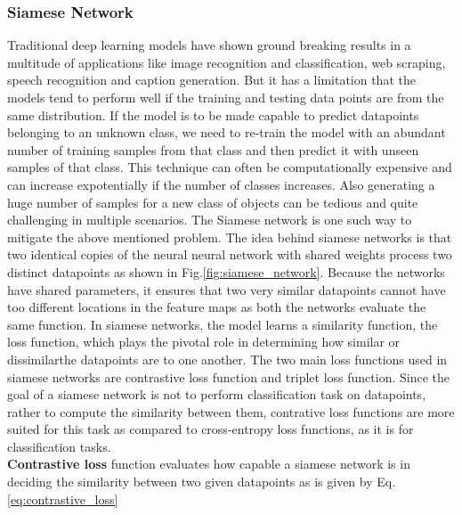 \subsubsection{Siamese Network}
Traditional deep learning models have shown ground breaking results in a multitude of applications like image recognition and classification, web scraping, speech recognition and caption generation. But it has a limitation that the models tend to perform well if the training and testing data points are from the same distribution. If the model is to be made capable to predict datapoints belonging to an unknown class, we need to re-train the model with an abundant number of training samples from that class and then predict it with unseen samples of that class. This technique can often be computationally expensive and can increase expotentially if the number of classes increases. Also generating a huge number of samples for a new class of objects can be tedious and quite challenging in multiple scenarios. The Siamese network\cite*{koch2015siamese,bromley1993signature} is one such way to mitigate the above mentioned problem. The idea behind siamese networks is that two identical copies of the neural neural network with shared weights process two distinct datapoints as shown in Fig.\ref*{fig:siamese_network}. Because the networks have shared parameters, it ensures that two very similar datapoints cannot have too different locations in the feature maps as both the networks evaluate the same function. In siamese networks, the model learns a similarity function, the loss function, which plays the pivotal role in determining how similar or dissimilarthe datapoints are to one another. The two main loss functions used in siamese networks are contrastive loss function\cite*{bromley1993signature} and triplet loss function\cite*{balntas2016learning}. Since the goal of a siamese network is not to perform classification task on datapoints, rather to compute the similarity between them, contrative loss functions are more suited for this task as compared to cross-entropy loss functions, as it is for classification tasks.\\
\textbf{Contrastive loss} function evaluates how capable a siamese network is in deciding the similarity between two given datapoints as is given by Eq.\ref*{eq:contrastive_loss}\cite*{siamese_network}
